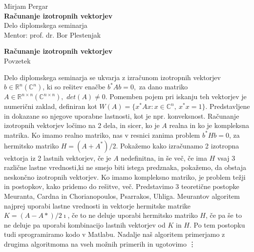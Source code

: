 \documentclass[12pt,a4paper]{amsart}
\theoremstyle{definition}
\theoremstyle{plain}
\newcommand{\R}{\mathbb R}
\newcommand{\C}{\mathbb C}
\begin{document}
\thispagestyle{empty}
\vfill

\begin{center}{\large
Mirjam Pergar\\[2mm]
{\bf Računanje izotropnih vektorjev}\\[10mm]
Delo diplomskega seminarja\\[1cm]
Mentor: prof. dr. Bor Plestenjak}
\end{center}
\vfill

\pagebreak

\thispagestyle{empty}
\tableofcontents
\pagebreak

\thispagestyle{empty}
\begin{center}
{\bf Računanje izotropnih vektorjev}\\[3mm]
{\sc Povzetek}
\end{center}
Delo diplomskega seminarja se ukvarja z izračunom izotropnih vektorjev $b\in\R^{n} (\C^{n})$, ki so rešitev enačbe $b^\ast Ab=0,$ za dano matriko $A\in\R^{n\times n} (\C^{n\times n}),$ $det(A)\ne 0$.
Pomemben pojem pri iskanju teh vektorjev je numerični zaklad, definiran kot $W(A)=\{x^\ast Ax\! : x \in \C^n,\ x^\ast x=1\}.$ Predstavljene in dokazane so njegove uporabne lastnosti, kot je npr. konveksnost.
Računanje izotropnih vektorjev ločimo na 2 dela, in sicer, ko je $A$ realna in ko je kompleksna matrika.
Ko imamo realno matriko, nas v resnici zanima problem $b^\ast Hb=0$, za hermitsko matriko $H=(A+A^\ast)/2$. 
Pokažemo kako izračunamo 2 izotropna vektorja iz 2 lastnih vektorjev, če je $A$ nedefinitna, in še več, če ima $H$ vsaj 3 različne lastne vrednosti,ki ne smejo biti istega predznaka, pokažemo, da obstaja neskončno izotropnih vektorjev.
Ko imamo kompleksno matriko, je problem težji in postopkov, kako pridemo do rešitve, več. Predstavimo 3 teoretične postopke Meuranta, Cardna in Chorianopoulos, Psarrakos, Uhliga.
Meurantov algoritem najprej uporabi lastne vrednosti in vektorje hermitske matrike $K=(A-A\ast)/2\imath$, če to ne deluje uporabi hermitsko matriko $H$, če pa še to ne deluje pa uporabi kombinacijo lastnih vektorjev od $K$ in $H$.
Po tem postopku tudi sprogramiramo kodo v Matlabu.
Nadalje naš algoritem primerjamo z drugima algoritmoma na vseh možnih primerih in ugotovimo \vdots
\end{document}
